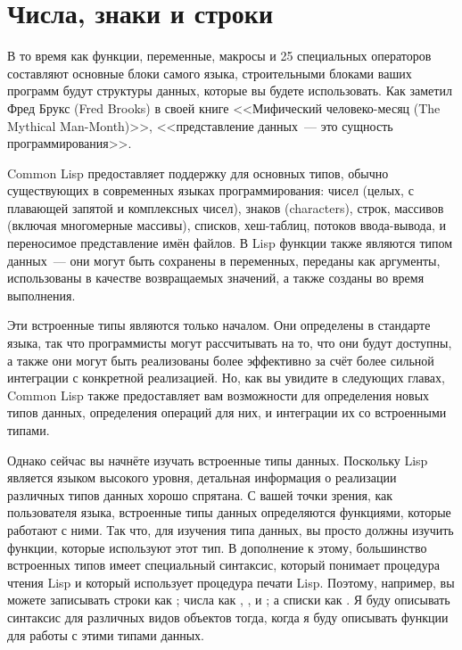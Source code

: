 \chapter{Числа, знаки и строки}
\label{ch:10}

В то время как функции, переменные, макросы и 25 специальных операторов составляют
основные блоки самого языка, строительными блоками ваших программ будут структуры данных,
которые вы будете использовать.  Как заметил Фред Брукс (Fred Brooks) в своей книге
<<Мифический человеко-месяц (The Mythical Man-Month)>>, <<представление данных~--- это
сущность программирования>>.

Common Lisp предоставляет поддержку для основных типов, обычно существующих в современных
языках программирования: чисел (целых, с плавающей запятой и комплексных чисел), знаков
(characters), строк, массивов
(включая многомерные массивы), списков, хеш-таблиц, потоков ввода-вывода, и переносимое
представление имён файлов.  В Lisp функции также являются типом данных~--- они могут быть
сохранены в переменных, переданы как аргументы, использованы в качестве возвращаемых
значений, а также созданы во время выполнения.

Эти встроенные типы являются только началом.  Они определены в стандарте языка, так что
программисты могут рассчитывать на то, что они будут доступны, а также они могут быть
реализованы более эффективно за счёт более сильной интеграции с конкретной реализацией.
Но, как вы увидите в следующих главах, Common Lisp также предоставляет вам возможности для
определения новых типов данных, определения операций для них, и интеграции их со
встроенными типами.

Однако сейчас вы начнёте изучать встроенные типы данных.  Поскольку Lisp является языком
высокого уровня, детальная информация о реализации различных типов данных хорошо спрятана.
С вашей точки зрения, как пользователя языка, встроенные типы данных определяются
функциями, которые работают с ними.  Так что, для изучения типа данных, вы просто должны
изучить функции, которые используют этот тип.  В дополнение к этому, большинство
встроенных типов имеет специальный синтаксис, который понимает процедура чтения Lisp и
который использует процедура печати Lisp.  Поэтому, например, вы можете записывать строки
как ; числа как , , и ; а списки как .  Я буду описывать синтаксис для различных видов объектов тогда, когда я буду
описывать функции для работы с этими типами данных.

